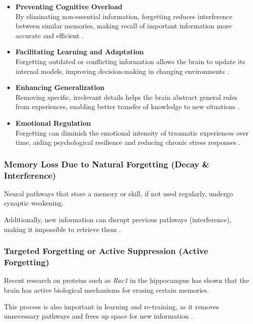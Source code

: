         \begin{itemize}
            \item \textbf{Preventing Cognitive Overload} \\
                By eliminating non-essential information, forgetting reduces interference between similar memories, making recall of important information more accurate and efficient .
            \item \textbf{Facilitating Learning and Adaptation} \\
                Forgetting outdated or conflicting information allows the brain to update its internal models, improving decision-making in changing environments .
            \item \textbf{Enhancing Generalization} \\
                Removing specific, irrelevant details helps the brain abstract general rules from experiences, enabling better transfer of knowledge to new situations .
            \item \textbf{Emotional Regulation} \\
                Forgetting can diminish the emotional intensity of traumatic experiences over time, aiding psychological resilience and reducing chronic stress responses .
        \end{itemize}

        \subsubsection{Memory Loss Due to Natural Forgetting (Decay \& Interference)}
        Neural pathways that store a memory or skill, if not used regularly, undergo synaptic weakening.

        Additionally, new information can disrupt previous pathways (interference), making it impossible to retrieve them .

        \subsubsection{Targeted Forgetting or Active Suppression (Active Forgetting)}
        Recent research on proteins such as \textit{Rac1} in the hippocampus has shown that the brain has active biological mechanisms for erasing certain memories.

        This process is also important in learning and re-training, as it removes unnecessary pathways and frees up space for new information .



